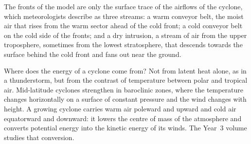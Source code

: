 \begin{omfigure}
\par{}
\end{omfigure}

The fronts of the model are only the surface trace of the airflows of the cyclone, which
meteorologists describe as three streams: a warm conveyor belt, the moist air that rises from the
warm sector ahead of the cold front; a cold conveyor belt on the cold side of the fronts; and a
dry intrusion, a stream of air from the upper troposphere, sometimes from the lowest
stratosphere, that descends towards the surface behind the cold front and fans out near the
ground.

Where does the energy of a cyclone come from? Not from latent heat alone, as in a thunderstorm,
but from the contrast of temperature between polar and tropical air. Mid-latitude cyclones
strengthen in baroclinic zones, where the temperature changes horizontally on a surface of
constant pressure and the wind changes with height. A growing cyclone carries warm air poleward
and upward and cold air equatorward and downward: it lowers the centre of mass of the
atmosphere and converts potential energy into the kinetic energy of its winds. The Year~3
volume studies that conversion.

